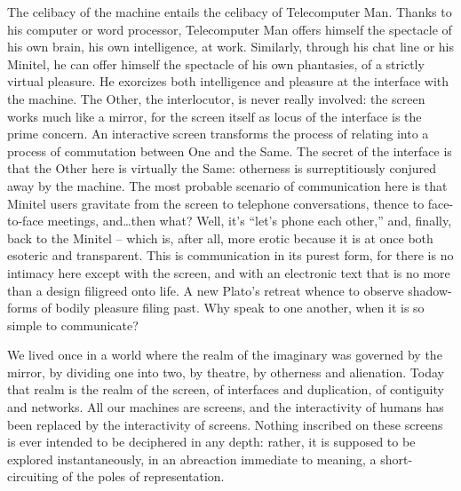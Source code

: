 \documentclass[10pt,twoside,openany]{memoir}
\begin{document}
The celibacy of the machine entails the celibacy of Telecomputer Man. Thanks to his computer or word processor, Telecomputer Man offers himself the spectacle of his own brain, his own intelligence, at work. Similarly, through his chat line or his Minitel, he can offer himself the spectacle of his own phantasies, of a strictly virtual pleasure. He exorcizes both intelligence and pleasure at the interface with the machine. The Other, the interlocutor, is never really involved: the screen works much like a mirror, for the screen itself as locus of the interface is the prime concern. An interactive screen transforms the process of relating into a process of commutation between One and the Same. The secret of the interface is that the Other here is virtually the Same: otherness is surreptitiously conjured away by the machine. The most probable scenario of communication here is that Minitel users gravitate from the screen to telephone conversations, thence to face-to-face meetings, and\dots then what? Well, it's ``let's phone each other,'' and, finally, back to the Minitel -- which is, after all, more erotic because it is at once both esoteric and transparent. This is communication in its purest form, for there is no intimacy here except with the screen, and with an electronic text that is no more than a design filigreed onto life. A new Plato's retreat whence to observe shadow-forms of bodily pleasure filing past. Why speak to one another, when it is so simple to communicate?

We lived once in a world where the realm of the imaginary was governed by the mirror, by dividing one into two, by theatre, by otherness and alienation. Today that realm is the realm of the screen, of interfaces and duplication, of contiguity and networks. All our machines are screens, and the interactivity of humans has been replaced by the interactivity of screens. Nothing inscribed on these screens is ever intended to be deciphered in any depth: rather, it is supposed to be explored instantaneously, in an abreaction immediate to meaning, a short-circuiting of the poles of representation.
\end{document}
